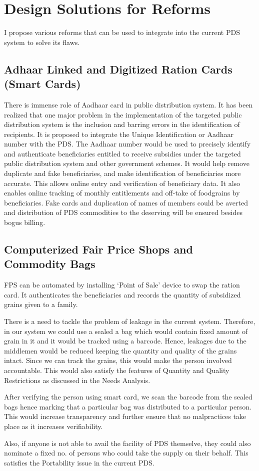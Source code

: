 \documentclass{article}
\begin{document}
\section{Design Solutions for Reforms}

I propose various reforms that can be used to integrate into the current PDS system to solve its flaws. 

\subsection{Adhaar Linked and Digitized Ration Cards (Smart Cards)}

There is immense role of Aadhaar card in public distribution system. It has been realized that one major problem in the implementation of the targeted public distribution system is the inclusion and barring errors in the identification of recipients. It is proposed to integrate the Unique Identification or Aadhaar number with the PDS. The Aadhaar number would be used to precisely identify and authenticate beneficiaries entitled to receive subsidies under the targeted public distribution system and other government schemes. It would help remove duplicate and fake beneficiaries, and make identification of beneficiaries more accurate. This allows online entry and verification of beneficiary data. It also enables online tracking of monthly entitlements and off-take of foodgrains by beneficiaries. Fake cards and duplication of names of members could be averted and distribution of PDS commodities to the deserving will be ensured besides bogus billing. 

\subsection{Computerized Fair Price Shops and Commodity Bags}
FPS can be automated by installing ‘Point of Sale’ device to swap the ration card. It authenticates the beneficiaries and records the quantity of subsidized grains given to a family.
\par There is a need to tackle the problem of leakage in the current system. Therefore, in our system we could use a sealed a bag which would contain fixed amount of grain in it and it would be tracked using a barcode. Hence, leakages due to the middlemen would be reduced keeping the quantity and quality of the grains intact. Since we can track the grains, this would make the person involved accountable. This would also satisfy the features of Quantity and Quality Restrictions as discussed in the Needs Analysis.
\par After verifying the person using smart card, we scan the barcode from the sealed bags hence marking that a particular bag was distributed to a particular person. This would increase transparency and further ensure that no malpractices take place as it increases verifiability. 
\par Also, if anyone is not able to avail the facility of PDS themselve, they could also nominate a fixed no. of persons who could take the supply on their behalf. This satisfies the Portability issue in the current PDS.
\end{document}
